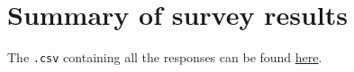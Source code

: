 
\chapter{Summary of survey results} %

\label{AppendixB} %
The \texttt{.csv} containing all the responses can be found \href{https://github.com/TristanKoh/capstone-repo/blob/main/dataset/survey_results.csv}{here}.




